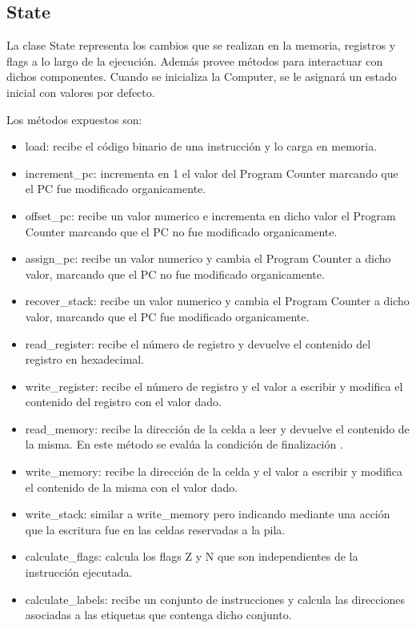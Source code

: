 \label{subsec:condfin}

\subsection{State}
La clase State representa los cambios que se realizan en la memoria, registros y flags a lo largo de la ejecución. Además provee métodos para interactuar con dichos componentes. Cuando se inicializa la Computer, se le asignará un estado inicial con valores por defecto.

Los métodos expuestos son: 
\begin{itemize}
\item load: recibe el código binario de una instrucción y lo carga en memoria.
\item increment\_pc: incrementa en 1 el valor del Program Counter marcando que el PC fue modificado organicamente.
\item offset\_pc: recibe un valor numerico e incrementa en dicho valor el Program Counter marcando que el PC no fue modificado organicamente.
\item assign\_pc: recibe un valor numerico y cambia el Program Counter a dicho valor, marcando que el PC no fue modificado organicamente.
\item recover\_stack: recibe un valor numerico y cambia el Program Counter a dicho valor, marcando que el PC fue modificado organicamente.
\item read\_register: recibe el número de registro y devuelve el contenido del registro en hexadecimal.
\item write\_register: recibe el número de registro y el valor a escribir y modifica el contenido del registro con el valor dado.
\item read\_memory: recibe la dirección de la celda a leer y devuelve el contenido de la misma. En este método se evalúa la condición de finalización .
\item write\_memory: recibe la dirección de la celda y el valor a escribir y modifica el contenido de la misma con el valor dado.
\item write\_stack: similar a write\_memory pero indicando mediante una acción que la escritura fue en las celdas reservadas a la pila.
\item calculate\_flags: calcula los flags Z y N que son independientes de la instrucción ejecutada.
\item calculate\_labels: recibe un conjunto de instrucciones y calcula las direcciones asociadas a las etiquetas que contenga dicho conjunto.
\end{itemize}

